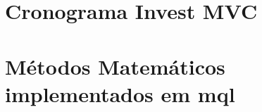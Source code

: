 \begin{apendicesenv}

\partapendices

\chapter{}


\chapter{}


\chapter{}


\chapter{}


\chapter{}


\chapter{}


\chapter{Cronograma Invest MVC}

\chapter{Métodos Matemáticos implementados em mql}







\end{apendicesenv}
